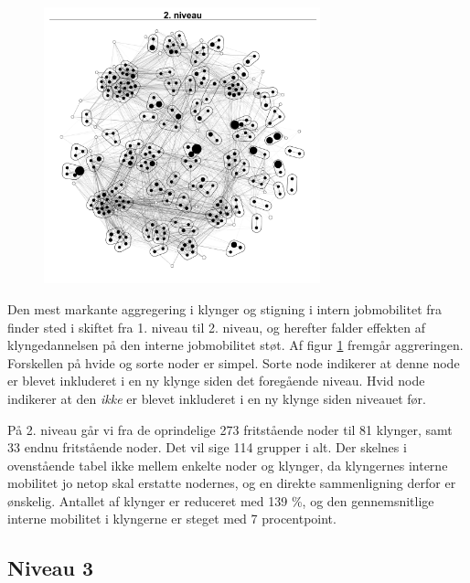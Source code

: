 \begin{figure}
  \vspace{-20pt}
  \begin{center}
   \caption{}
   \label{fig_delanalyse1_kort_seg_proces2}
    \includegraphics[width=8cm]{fig/netvaerkskort/kort_seg_proces2.pdf}
  \end{center}
  \vspace{-20pt}
\end{figure}

Den mest markante aggregering i klynger og stigning i intern jobmobilitet fra finder sted i skiftet fra 1. niveau til 2. niveau, og herefter falder effekten af klyngedannelsen på den interne jobmobilitet støt. Af figur \ref{fig_delanalyse1_kort_seg_proces2} fremgår aggreringen. Forskellen på hvide og sorte noder er simpel. Sorte node indikerer at denne node er blevet inkluderet i en ny klynge siden det foregående niveau. Hvid node indikerer at den \emph{ikke} er blevet inkluderet i en ny klynge siden niveauet før. 

På 2. niveau går vi fra de oprindelige 273 fritstående noder til 81 klynger, samt 33 endnu fritstående noder. Det vil sige 114 grupper i alt. Der skelnes i ovenstående tabel ikke mellem enkelte noder og klynger, da klyngernes interne mobilitet jo netop skal erstatte nodernes, og en direkte sammenligning derfor er ønskelig. Antallet af klynger er reduceret med 139 \%, og den gennemsnitlige interne mobilitet i klyngerne er steget med 7 procentpoint.


\newpage \subsection{Niveau 3}

